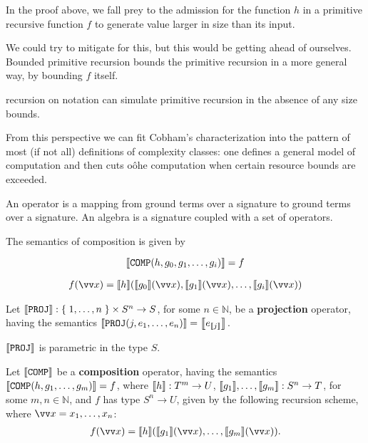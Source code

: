 In the proof above, we fall prey to the admission for the function $h$ in a
primitive recursive function $f$ to generate value larger in size than its
input.

We could try to mitigate for this, but this would be getting ahead of
ourselves. Bounded primitive recursion bounds the primitive recursion in a more
general way, by bounding $f$ itself.

recursion on notation can simulate primitive recursion in the absence of any
size bounds\cite{bellantoni-phd-1992}.

From this perspective we can fit Cobham's characterization into the pattern of
most (if not all) definitions of complexity classes: one defines a general
model of computation and then cuts oôhe computation when certain resource
bounds are exceeded.

An operator is a mapping from ground terms over a signature to ground terms
over a signature. An algebra is a signature coupled with a set of operators.

The semantics of composition is given by

$${\mathopen{}\left\llbracket{\mathtt{COMP}{\ensuremath{\mathopen{}\left({h,g_0,g_1,\ldots,g_i}\right)\mathclose{}}}}\right\rrbracket\mathclose{}} = f$$

\begin{align*}
%
f\p{\vect{x}} = \sem{h}\p{\sem{g_0}\p{\vect{x}}, \sem{g_1}\p{\vect{x}}, \ldots,
\sem{g_i}\p{\vect{x}}}
%
\end{align*}

\begin{definition} Let ${\mathopen{}\left\llbracket{\mathtt{PROJ}}\right\rrbracket\mathclose{}} : \mathopen{}\left\{\mathrel{}{1,\ldots, n}\mathrel{}\right\}\mathclose{} \times S^n
\rightarrow S$, for some $n \in \mathbb{N}$, be a \textbf{projection} operator,
having the semantics ${\mathopen{}\left\llbracket{\mathtt{PROJ}{\ensuremath{\mathopen{}\left({j, e_1,\ldots,e_n}\right)\mathclose{}}}}\right\rrbracket\mathclose{}} =
{\mathopen{}\left\llbracket{e_{\ensuremath{\mathopen{}\left\llbracket{j}\right\rrbracket\mathclose{}}}}\right\rrbracket\mathclose{}}$.  \end{definition}

\begin{remark} ${\mathopen{}\left\llbracket{\mathtt{PROJ}}\right\rrbracket\mathclose{}}$ is parametric in the type $S$.
\end{remark}

\begin{definition} Let ${\mathopen{}\left\llbracket{\mathtt{COMP}}\right\rrbracket\mathclose{}}$ be a \textbf{composition}
operator, having the semantics ${\mathopen{}\left\llbracket{\mathtt{COMP}{\ensuremath{\mathopen{}\left({h,g_1,\ldots,g_m}\right)\mathclose{}}}}\right\rrbracket\mathclose{}} = f$,
where ${\mathopen{}\left\llbracket{h}\right\rrbracket\mathclose{}} : T^m \rightarrow U$, ${\mathopen{}\left\llbracket{g_1}\right\rrbracket\mathclose{}}, \ldots, {\mathopen{}\left\llbracket{g_m}\right\rrbracket\mathclose{}} : S^n
\rightarrow T$, for some $m,n \in \mathbb{N}$, and $f$ has type $S^n
\rightarrow U$, given by the following recursion scheme, where $\vect{x} =
x_1,\ldots,x_n$:\begin{align*}
%
f\p{\vect{x}} = \sem{h}\p{\sem{g_1}\p{\vect{x}}, \ldots,
\sem{g_m}\p{\vect{x}}}.
%
\end{align*}

\end{definition}

